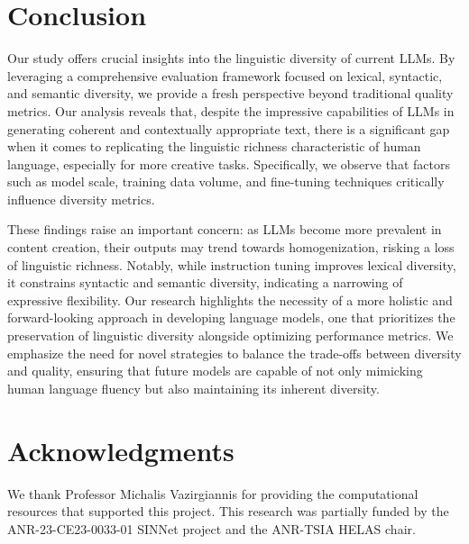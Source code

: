 \documentclass[11pt,a4paper]{article}
\begin{document}
\section{Conclusion}
Our study offers crucial insights into the linguistic diversity of current LLMs. By leveraging a comprehensive evaluation framework focused on lexical, syntactic, and semantic diversity, we provide a fresh perspective beyond traditional quality metrics. Our analysis reveals that, despite the impressive capabilities of LLMs in generating coherent and contextually appropriate text, there is a significant gap when it comes to replicating the linguistic richness characteristic of human language, especially for more creative tasks. Specifically, we observe that factors such as model scale, training data volume, and fine-tuning techniques critically influence diversity metrics.

These findings raise an important concern: as LLMs become more prevalent in content creation, their outputs may trend towards homogenization, risking a loss of linguistic richness. Notably, while instruction tuning improves lexical diversity, it constrains syntactic and semantic diversity, indicating a narrowing of expressive flexibility. Our research highlights the necessity of a more holistic and forward-looking approach in developing language models, one that prioritizes the preservation of linguistic diversity alongside optimizing performance metrics. We emphasize the need for novel strategies to balance the trade-offs between diversity and quality, ensuring that future models are capable of not only mimicking human language fluency but also maintaining its inherent diversity.

\section*{Acknowledgments}
We thank Professor Michalis Vazirgiannis for providing the computational resources that supported this project. This research was partially funded by the ANR-23-CE23-0033-01 SINNet project and the ANR-TSIA HELAS chair.





%
\end{document}
